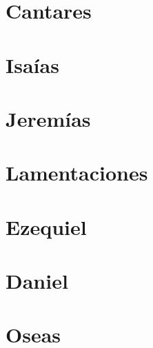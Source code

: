\chapter{Cantares}
\begin{multicols}{2}
  \parskip=0pt \relax
  
\end{multicols}

\chapter{Isaías}
\begin{multicols}{2}
  \parskip=0pt \relax
  
\end{multicols}

\chapter{Jeremías}
\begin{multicols}{2}
  \parskip=0pt \relax
  
\end{multicols}

\chapter{Lamentaciones}
\begin{multicols}{2}
  \parskip=0pt \relax
  
\end{multicols}

\chapter{Ezequiel}
\begin{multicols}{2}
  \parskip=0pt \relax
  
\end{multicols}

\chapter{Daniel}
\begin{multicols}{2}
  \parskip=0pt \relax
  
\end{multicols}

\chapter{Oseas}
\begin{multicols}{2}
  \parskip=0pt \relax
  
\end{multicols}

